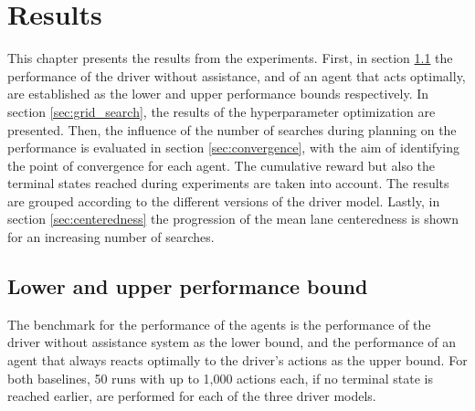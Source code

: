 \chapter{Results}
\label{ch:results}

This chapter presents the results from the experiments. First, in section \ref{sec:perf_bounds} the performance of the driver without assistance, and of an agent that acts optimally, are established as the lower and upper performance bounds respectively. In section \ref{sec:grid_search}, the results of the hyperparameter optimization are presented. Then, the influence of the number of searches during planning  on the performance is evaluated in section \ref{sec:convergence}, with the aim of identifying the point of convergence for each agent. The cumulative reward but also the terminal states reached during experiments are taken into account. The results are grouped according to the different versions of the driver model. Lastly, in section \ref{sec:centeredness} the progression of the mean lane centeredness is shown for an increasing number of searches.




\section{Lower and upper performance bound}
\label{sec:perf_bounds}


The benchmark for the performance of the agents is the performance of the driver without assistance system as the lower bound, and the performance of an agent that always reacts optimally to the driver's actions as the upper bound. For both baselines, 50 runs with up to 1,000 actions each, if no terminal state is reached earlier, are performed for each of the three driver models. 

